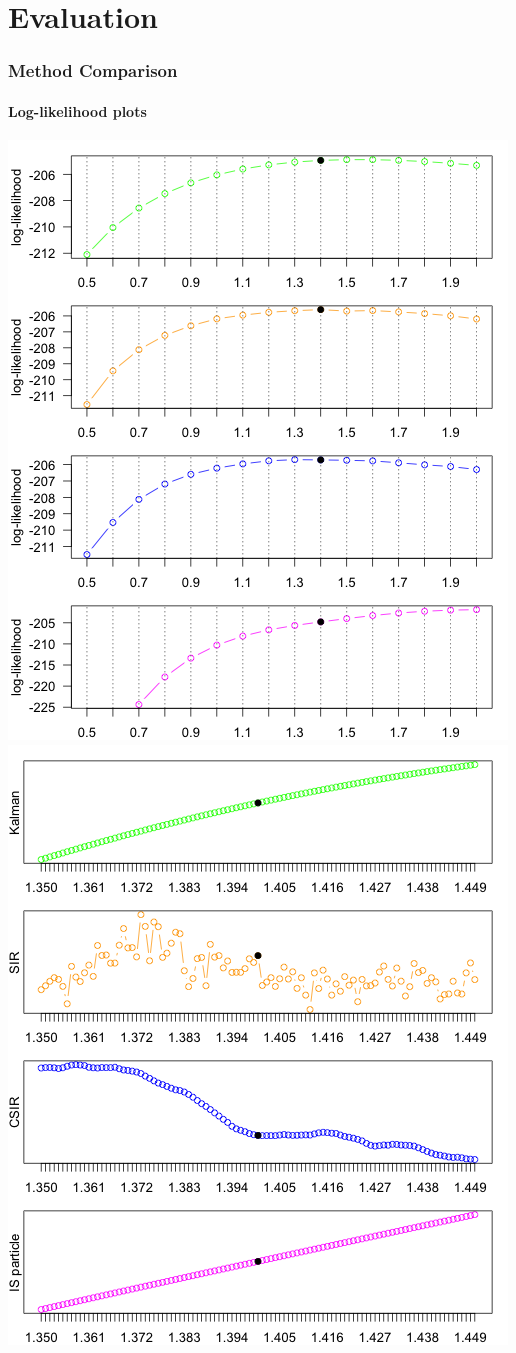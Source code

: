 \documentclass[11pt]{beamer}
\begin{document}
\section{Evaluation}

\begin{frame}
\frametitle{Method Comparison}
\framesubtitle{Log-likelihood plots}
\centering
\includegraphics[scale=0.30]{ullm-loglik-eta}
\includegraphics[scale=0.30]{ullm-loglik-zoom}

\end{frame}
\end{document}
